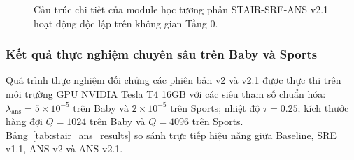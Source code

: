 \begin{figure}[H]
\caption{Cấu trúc chi tiết của module học tương phản STAIR-SRE-ANS v2.1 hoạt động độc lập trên không gian Tầng 0.}
\label{fig:stair_v2_1_cl_only}
\end{figure}

\subsubsection{Kết quả thực nghiệm chuyên sâu trên Baby và Sports}

Quá trình thực nghiệm đối chứng các phiên bản v2 và v2.1 được thực thi trên môi trường GPU NVIDIA Tesla T4 16GB với các siêu tham số chuẩn hóa: $\lambda_{\text{ans}} = 5 \times 10^{-5}$ trên Baby và $2 \times 10^{-5}$ trên Sports; nhiệt độ $\tau = 0.25$; kích thước hàng đợi $Q = 1024$ trên Baby và $Q = 4096$ trên Sports. Bảng~\ref{tab:stair_ans_results} so sánh trực tiếp hiệu năng giữa Baseline, SRE v1.1, ANS v2 và ANS v2.1.


